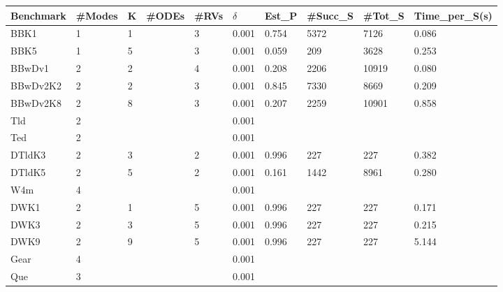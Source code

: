 \documentclass[runningheads,a4paper]{llncs}
\begin{document}
\begin{table}[h]
    \begin{tabular}{|l|l|l|l|l|l|l|l|l|l|}
    \hline
    Benchmark & \#Modes & K & \#ODEs & \#RVs & $\delta$ & Est\_P & \#Succ\_S & \#Tot\_S & Time\_per\_S(s) \\ \hline
    BBK1      & 1       & 1 & ~      & 3     & 0.001           & 0.754  & 5372   & 7126   & 0.086        \\ \hline
    BBK5      & 1       & 5 & ~      & 3     & 0.001           & 0.059  & 209    & 3628   & 0.253        \\ \hline
    BBwDv1    & 2       & 2 & ~      & 4     & 0.001           & 0.208  & 2206   & 10919  & 0.080        \\ \hline
    BBwDv2K2  & 2       & 2 & ~      & 3     & 0.001           & 0.845  & 7330   & 8669   & 0.209        \\ \hline
    BBwDv2K8  & 2       & 8 & ~      & 3     & 0.001           & 0.207  & 2259   & 10901  & 0.858        \\ \hline
    Tld       & 2       & ~ & ~      & ~     & 0.001           & ~      & ~      & ~      & ~            \\ \hline
    Ted       & 2       & ~ & ~      & ~     & 0.001           & ~      & ~      & ~      & ~            \\ \hline
    DTldK3    & 2       & 3 & ~      & 2     & 0.001           & 0.996  & 227    & 227    & 0.382        \\ \hline
    DTldK5    & 2       & 5 & ~      & 2     & 0.001           & 0.161  & 1442   & 8961   & 0.280        \\ \hline
    W4m       & 4       & ~ & ~      & ~     & 0.001           & ~      & ~      & ~      & ~            \\ \hline
    DWK1      & 2       & 1 & ~      & 5     & 0.001           & 0.996  & 227    & 227    & 0.171        \\ \hline
    DWK3      & 2       & 3 & ~      & 5     & 0.001           & 0.996  & 227    & 227    & 0.215        \\ \hline
    DWK9      & 2       & 9 & ~      & 5     & 0.001           & 0.996  & 227    & 227    & 5.144        \\ \hline
    Gear      & 4       & ~ & ~      & ~     & 0.001           & ~      & ~      & ~      & ~            \\ \hline
    Que       & 3       & ~ & ~      & ~     & 0.001           & ~      & ~      & ~      & ~            \\ \hline

\end{tabular}
\end{table}
\end{document}
